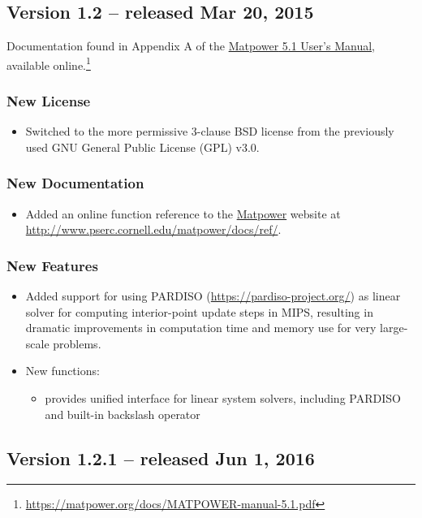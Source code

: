 \documentclass[12pt]{article}
\newcommand{\matpower}[0]{{\sc Matpower}}
\newcommand{\matpowerurl}[0]{https://matpower.org}
\newcommand{\matpowerlink}[0]{\href{\matpowerurl}{\matpower{}}}
\newcommand{\mips}[0]{{MIPS}}
\newcommand{\pardiso}[0]{{PARDISO}}
\newcommand{\code}[1]{{\relsize{-0.5}{\tt{{#1}}}}}  %
\numberwithin{equation}{section}
\numberwithin{table}{section}
\numberwithin{figure}{section}
\begin{document}
\begin{appendices}
\subsection{Version 1.2 -- released Mar 20, 2015}
\label{app:v12}

Documentation found in Appendix A of the \href{https://matpower.org/docs/MATPOWER-manual-5.1.pdf}{\matpower{} 5.1 User's Manual}, available online.\footnote{\url{https://matpower.org/docs/MATPOWER-manual-5.1.pdf}}

\subsubsection*{New License}
\begin{itemize}
\item Switched to the more permissive 3-clause BSD license from the previously used GNU General Public License (GPL) v3.0.
\end{itemize}

\subsubsection*{New Documentation}
\begin{itemize}
\item Added an online function reference to the \matpowerlink{} website at \url{http://www.pserc.cornell.edu/matpower/docs/ref/}.
\end{itemize}

\subsubsection*{New Features}
\begin{itemize}
\item Added support for using \pardiso{} (\url{https://pardiso-project.org/}) as linear solver for computing interior-point update steps in \mips{}, resulting in dramatic improvements in computation time and memory use for very large-scale problems.
\item New functions:
    \begin{itemize}
    \item \code{mplinsolve()} provides unified interface for linear system solvers, including \pardiso{} and built-in backslash operator
    \end{itemize}
\end{itemize}


\subsection{Version 1.2.1 -- released Jun 1, 2016}
\label{app:v121}


\end{appendices}
\end{document}
